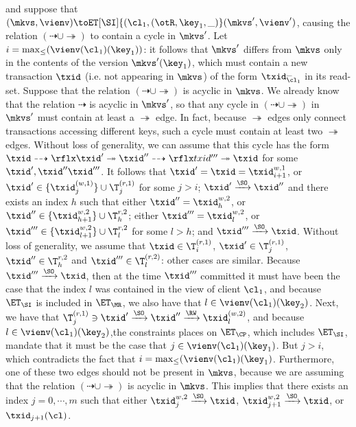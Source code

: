 and suppose that $(\mkvs, \vienv) \toET[\SI]{(\cl_{1}, (\otR, \key_{1}, \_)} (\mkvs', \vienv')$, causing the relation 
$(\dashrightarrow \cup \twoheadrightarrow)$ to contain a cycle in $\mkvs'$. Let $i = \max_{\leq}(\vienv(\cl_1)(\key_1))$: 
it follows that $\mkvs'$ differs from $\mkvs$ only in the contents of the version $\mkvs'(\key_{1})$, 
which must contain a new transaction $\txid$ (i.e. not appearing in $\mkvs$) of the form $\txid_{\cl_{1}}^{\_}$ in its read-set.
Suppose that the relation $(\dashrightarrow \cup \twoheadrightarrow)$  
is acyclic in $\mkvs$. We already know that the relation $\dashrightarrow$ is acyclic in $\mkvs'$, so that 
any cycle in $(\dashrightarrow \cup \twoheadrightarrow)$ in $\mkvs'$ must contain at least a $\twoheadrightarrow$ 
edge. In fact, because $\twoheadrightarrow$ edges only connect transactions accessing different keys, such 
a cycle must contain at least two $\twoheadrightarrow$ edges. Without loss of generality, we can assume that 
this cycle has the form $\txid \dashrightarrow\rflx \txid' \twoheadrightarrow \txid'' \dashrightarrow\rflx txid''' \twoheadrightarrow \txid$ 
for some $\txid', \txid'' \txid'''$. It follows that $\txid' = \txid = \txid^{w,1}_{i+1}$, or $\txid' \in \{\txid^{(w,1)}_{j}\} \cup \T^{(r,1)}_{j}$ 
for some $j > i$;  $\txid' \xrightarrow{\SO} \txid''$ and there exists an index $h$ such that either $\txid'' = \txid^{w,2}_{h}$, 
or $\txid'' \in \{\txid^{w,2}_{h+1}\} \cup \T^{r,2}_{h}$; 
either $\txid''' = \txid^{w,2}_{l}$, or $\txid''' \in \{\txid^{w,2}_{l+1}\} \cup \T^{r,2}_{l}$ for some $l > h$; and $\txid''' \xrightarrow{\SO} \txid$.
Without loss of generality, we assume that $\txid \in \T^{(r,1)}_{i}$, 
$\txid' \in \T^{(r,1)}_{j}$, $\txid'' \in \T^{r,2}_{h}$ and $\txid''' \in \T^{(r,2)}_{l}$: other cases are similar. 
Because $\txid''' \xrightarrow{\SO} \txid$, then at the time $\txid'''$ committed it must have been the case 
that the index $l$ was contained in the view of client $\cl_1$, and because $\ET_{\SI}$ is included in $\ET_{\MR}$, we also have 
that $l \in \vienv(\cl_{1})(\key_{2})$. Next, we have that $\T^{(r,1)}_{j} \ni \txid' \xrightarrow{\SO} \txid'' \xrightarrow{\RW} \txid^{(w,2)}_{l}$, 
and because $l \in \vienv(\cl_{1})(\key_{2})$,the constraints places on $\ET_{\CP}$, which includes $\ET_{\SI}$,  mandate that it must be the case that 
$j \in \vienv(\cl_{1})(\key_{1})$. But $j > i$, which contradicts the fact that $i = \max_{\leq}(\vienv(\cl_1)(\key_1)$.
Furthermore, one of these two edges should not 
be present in $\mkvs$, because we are assuming that the relation $(\dashrightarrow \cup \twoheadrightarrow)$ is 
acyclic in $\mkvs$. This implies that there exists an index $j = 0,\cdots, m$ such that either $\txid_{j}^{w, 2} 
\xrightarrow{\SO} \txid$, $\txid_{j+1}^{w,2} \xrightarrow{\SO} \txid$, or $\txid_{j+1}(\cl)$.

